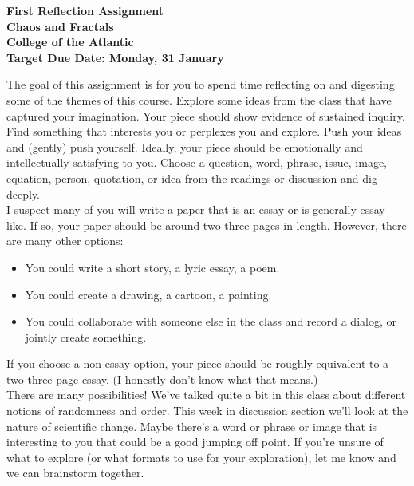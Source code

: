 \documentclass[12pt]{article}
\begin{document}
\pagestyle{empty}
 
\begin{center}
{\LARGE {\bf First Reflection Assignment}}\\
\bigskip
{\Large {\bf Chaos and Fractals}}\\
\bigskip
{\Large {\bf College of the Atlantic}}\\
\bigskip
{{\bf Target Due Date: Monday, 31 January}}\\
\end{center}
\medskip


 The goal of this assignment is for you to spend
time reflecting on and digesting some of the themes of this course.
Explore some ideas from the class that have captured your imagination.
Your piece should show evidence of sustained inquiry.  Find something
that interests you or perplexes you and explore.  Push your ideas and
(gently) push yourself.  Ideally, your piece should be emotionally and
intellectually satisfying to you.  Choose a question, word, phrase,
issue, image, equation, person, quotation, or idea from the readings
or discussion and dig deeply.  \\


 I suspect many of you will write a paper that
is an essay or is generally essay-like.  If so, your paper should be
around two-three pages in length.  However, there are many other
options: 
\begin{itemize}
\item You could write a short story, a lyric essay, a poem.
\item You could create a drawing, a cartoon, a painting.
\item You could collaborate with someone else in the class and record
  a dialog, or jointly create something.
\end{itemize}
If you choose a non-essay option, your piece should be roughly
equivalent to a two-three page essay.  (I honestly don't know what
that means.)\\

 There are many possibilities! We've
talked quite a bit in this class about different notions of randomness
and order. This week in discussion section we'll look at the nature of
scientific change. Maybe there's a word or phrase or image that is
interesting to you that could be a good jumping off point. If you're
unsure of what to explore (or what formats to use for your
exploration), let me know and we can brainstorm together.\\
  
\end{document}
